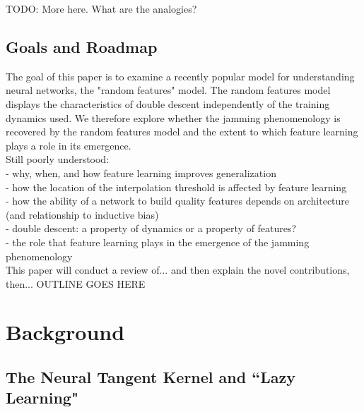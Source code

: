 \documentclass[a4paper, 12pt]{article}
\begin{document}
TODO: More here. What are the analogies? 

\subsection{Goals and Roadmap}

The goal of this paper is to examine a recently popular model for understanding neural networks, the "random features" model. The random features model displays the characteristics of double descent independently of the training dynamics used. We therefore explore whether the jamming phenomenology is recovered by the random features model and the extent to which feature learning plays a role in its emergence.\\


Still poorly understood:\\
- why, when, and how feature learning improves generalization\\
- how the location of the interpolation threshold is affected by feature learning\\
- how the ability of a network to build quality features depends on architecture (and relationship to inductive bias) \\
- double descent: a property of dynamics or a property of features?\\
- the role that feature learning plays in the emergence of the jamming phenomenology\\

This paper will conduct a review of... and then explain the novel contributions, then... OUTLINE GOES HERE

\section{Background}
\subsection{The Neural Tangent Kernel and ``Lazy Learning"}
\end{document}
